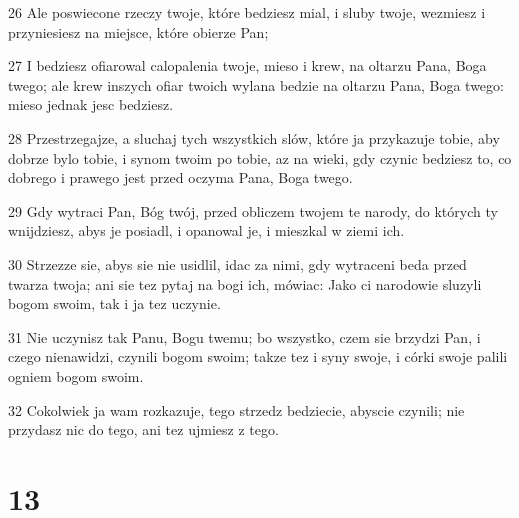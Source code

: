\par 26 Ale poswiecone rzeczy twoje, które bedziesz mial, i sluby twoje, wezmiesz i przyniesiesz na miejsce, które obierze Pan;
\par 27 I bedziesz ofiarowal calopalenia twoje, mieso i krew, na oltarzu Pana, Boga twego; ale krew inszych ofiar twoich wylana bedzie na oltarzu Pana, Boga twego: mieso jednak jesc bedziesz.
\par 28 Przestrzegajze, a sluchaj tych wszystkich slów, które ja przykazuje tobie, aby dobrze bylo tobie, i synom twoim po tobie, az na wieki, gdy czynic bedziesz to, co dobrego i prawego jest przed oczyma Pana, Boga twego.
\par 29 Gdy wytraci Pan, Bóg twój, przed obliczem twojem te narody, do których ty wnijdziesz, abys je posiadl, i opanowal je, i mieszkal w ziemi ich.
\par 30 Strzezze sie, abys sie nie usidlil, idac za nimi, gdy wytraceni beda przed twarza twoja; ani sie tez pytaj na bogi ich, mówiac: Jako ci narodowie sluzyli bogom swoim, tak i ja tez uczynie.
\par 31 Nie uczynisz tak Panu, Bogu twemu; bo wszystko, czem sie brzydzi Pan, i czego nienawidzi, czynili bogom swoim; takze tez i syny swoje, i córki swoje palili ogniem bogom swoim.
\par 32 Cokolwiek ja wam rozkazuje, tego strzedz bedziecie, abyscie czynili; nie przydasz nic do tego, ani tez ujmiesz z tego.

\chapter{13}

